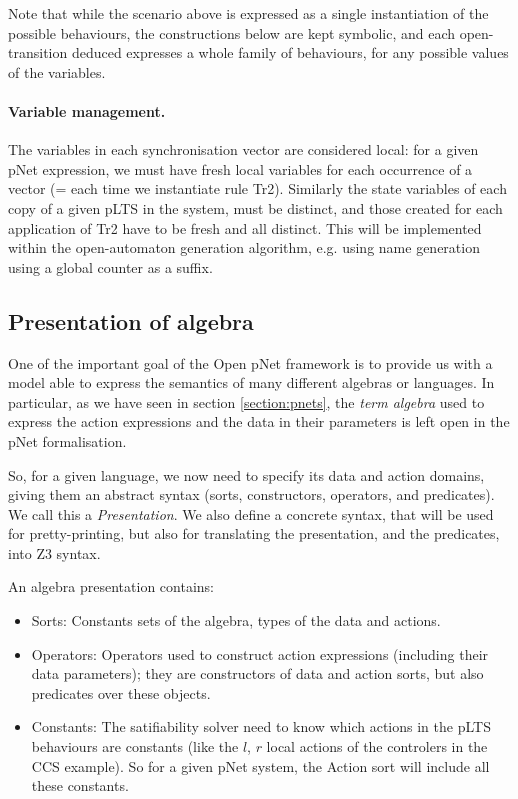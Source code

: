 \documentclass{lncs/llncs}
\begin{document}
    

Note that while the scenario above is expressed as a single
instantiation of the possible behaviours, the constructions below are
kept symbolic, and each open-transition deduced expresses a whole family of
behaviours, for any possible values of the variables.

\paragraph{Variable management.}
The variables in each synchronisation vector are considered local:
for a given pNet expression, we must have fresh local variables for
each occurrence of a vector (= each time we instantiate rule
Tr2). Similarly the state variables of each copy of a
given pLTS in the system, must be distinct, and those created for each
application of Tr2 have to be fresh and all distinct. 
This will be implemented within the open-automaton generation algorithm,
e.g. using name generation using a global counter as a suffix.


\subsection{Presentation of algebra}
One of the important goal of the Open pNet framework is to provide us
with a model able to express the semantics of many different algebras
or languages. In particular, as we have seen in section
\ref{section:pnets}, the \emph{term algebra} used to express the
action expressions and the data in their parameters is left open in
the pNet formalisation.

So, for a given language, we now need to specify its data and action
domains, giving them an abstract syntax (sorts, constructors, operators,
and predicates). We call this a \emph{Presentation}.
We also define a concrete syntax, that will be used for
pretty-printing, but also for translating the presentation, and the
predicates, into Z3 syntax. 

An algebra presentation contains:
\begin{itemize}
	\item Sorts: Constants sets of the algebra, types of the data
          and actions. 
	\item Operators: Operators used to construct action
          expressions (including their data parameters); they are
          constructors of data and action sorts, but also predicates
          over these objects.
        \item Constants: The satifiability solver need to know which
          actions in the pLTS behaviours are constants (like the $l$,
          $r$ local actions of the controlers in the CCS example). So
          for a given pNet system, the Action sort will include all
          these constants.
\end{itemize}
\end{document}
